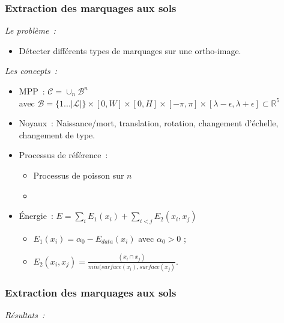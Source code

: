 \documentclass{beamer}
\begin{document}
\begin{frame}
\frametitle{Extraction des marquages aux sols}
\emph{Le probl\`eme~:} 
\begin{itemize}
\item Détecter différents types de marquages sur une ortho-image.
\end{itemize}
\emph{Les concepts~:}
\begin{itemize}
\item MPP~:  $\mathcal{C} = \cup_{n}\mathcal{B}^n$\\
avec $\mathcal{B}=\{1...\vert \mathcal{L}\vert\}\times [0,W]\times[0,H]\times[-\pi,\pi]\times[\lambda-\epsilon,\lambda + \epsilon] \subset  \mathds{R}^{5}$
\item Noyaux~: Naissance/mort, translation, rotation, changement d'échelle, changement de type. 
\item Processus de référence~:
\begin{itemize}
\item Processus de poisson sur $n$
\item \color{red}{Data\&Model driven}
\end{itemize}
\item \'Energie~: $E = \sum_i E_1(x_i) + \sum_{i<j} E_2(x_i,x_j)$
\begin{itemize}
\item $E_1(x_i)=\alpha_{0} - E_{data}(x_i)$ avec $\alpha_{0}>0$ ;
\item $E_2(x_i,x_j) = \frac{(x_i \cap x_j)}{min(surface(x_i),surface(x_j)}$.
\end{itemize}
\end{itemize}
\end{frame}
%
\begin{frame}
\frametitle{Extraction des marquages aux sols}
\emph{R\'esultats~:}
\begin{center}
\end{center}
\end{frame}
\end{document}
